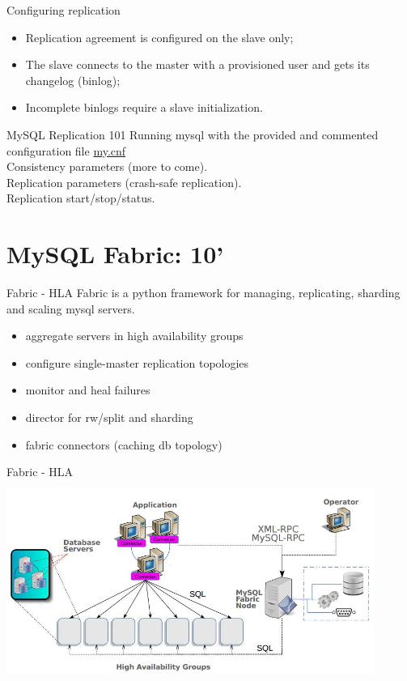 \documentclass{beamer}[10]
\begin{document}
\begin{pyframe}{Configuring replication}
\begin{itemize}
\item Replication agreement is configured on the slave only;
\item The slave connects to the master with a provisioned
 user and gets its changelog (binlog);
\item Incomplete binlogs require a slave initialization.
\end{itemize}
\end{pyframe}
\fi


\begin{pyframe}{MySQL Replication 101}
Running mysql with the provided and commented
configuration file \href{http://github.com/ioggstream/mysql-community/fabric}{my.cnf}
\\
Consistency parameters (more to come).
\\
Replication parameters (crash-safe replication).
\\
Replication start/stop/status.
\end{pyframe}


%
%
\section{MySQL Fabric: 10'}
\begin{pyframe}{Fabric - HLA}
Fabric is a python framework for managing, replicating, sharding and scaling mysql servers.
\begin{itemize}
\item aggregate servers in high availability groups
\item configure single-master replication topologies
\item monitor and heal failures
\item director for rw/split and sharding
\item fabric connectors (caching db topology)
\end{itemize}
\end{pyframe}


\begin{pyframe}{Fabric - HLA}
\includegraphics[height=6.6cm,width=12cm]{images/mysql-fabric-hla.jpg}
\end{pyframe}
\end{document}
